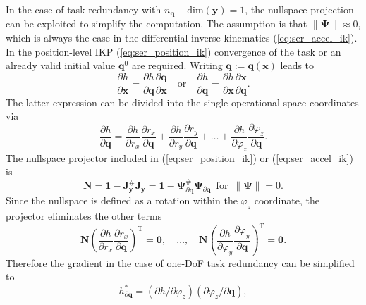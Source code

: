 \documentclass[a4paper,twoside]{article}
\newcommand{\transp}[0]{{\mathrm{T}}}
\begin{document}
In the case of task redundancy with $n_{\bm{q}}{-}\mathrm{dim}(\bm{y})=1$, the nullspace projection can be exploited to simplify the computation.
The assumption is that $\lVert\bm{\Psi}\rVert \approx 0$, which is always the case in the differential inverse kinematics (\ref{eq:ser_accel_ik}).
In the position-level IKP (\ref{eq:ser_position_ik}) convergence of the task or an already valid initial value $\bm{q}^{0}$ are required.
Writing $\bm{q}:=\bm{q}(\bm{x})$ leads to
\begin{equation}
\frac{\partial h}{\partial \bm{x}} = \frac{\partial h}{\partial \bm{q}} \frac{\partial \bm{q}}{\partial \bm{x}}
\quad \mathrm{or} \quad 
\frac{\partial h}{\partial \bm{q}} = \frac{\partial h}{\partial \bm{x}} \frac{\partial \bm{x}}{\partial \bm{q}}.
\label{eq:ser_gradient_opspace}
\end{equation}
The latter expression can be divided into the single operational space coordinates via
\begin{equation}
\frac{\partial h}{\partial \bm{q}} =
\frac{\partial h}{\partial r_x} \frac{\partial r_x}{\partial \bm{q}}
+
\frac{\partial h}{\partial r_y} \frac{\partial r_y}{\partial \bm{q}}
+ \hdots +
\frac{\partial h}{\partial \varphi_z} \frac{\partial \varphi_z}{\partial \bm{q}}.
\label{eq:ser_gradient_algebraic_conversion}
\end{equation}
The nullspace projector included in (\ref{eq:ser_position_ik}) or (\ref{eq:ser_accel_ik}) is
\begin{equation}
\bm{N} = \bm{1}-\bm{J}_{\bm{y}}^{\#}\bm{J}_{\bm{y}} = \bm{1}-\bm{\Psi}_{\partial \bm{q}}^{\#}\bm{\Psi}_{\partial \bm{q}}
\enspace \mathrm{for}\enspace \lVert\bm{\Psi}\rVert = 0.
\label{eq:ser_nullspace_projector}
\end{equation}
Since the nullspace is defined as a rotation within the $\varphi_z$ coordinate, the projector eliminates the other terms
\begin{equation}
\bm{N}\left(\frac{\partial h}{\partial r_x} \frac{\partial r_x}{\partial \bm{q}}\right)^\transp=\bm{0},
\quad \hdots, \quad 
\bm{N}\left(\frac{\partial h}{\partial \varphi_y} \frac{\partial \varphi_y}{\partial \bm{q}}\right)^\transp=\bm{0}.
\label{eq:serrob_nullspace_elim}
\end{equation}
Therefore the gradient in the case of one-DoF task redundancy can be simplified to
\begin{equation}
h_{\partial \bm{q}}^{*} = (\partial h / \partial \varphi_z) (\partial \varphi_z / \partial \bm{q}),
\label{eq:serrob_nullspace_phiz}
\end{equation}
\end{document}
